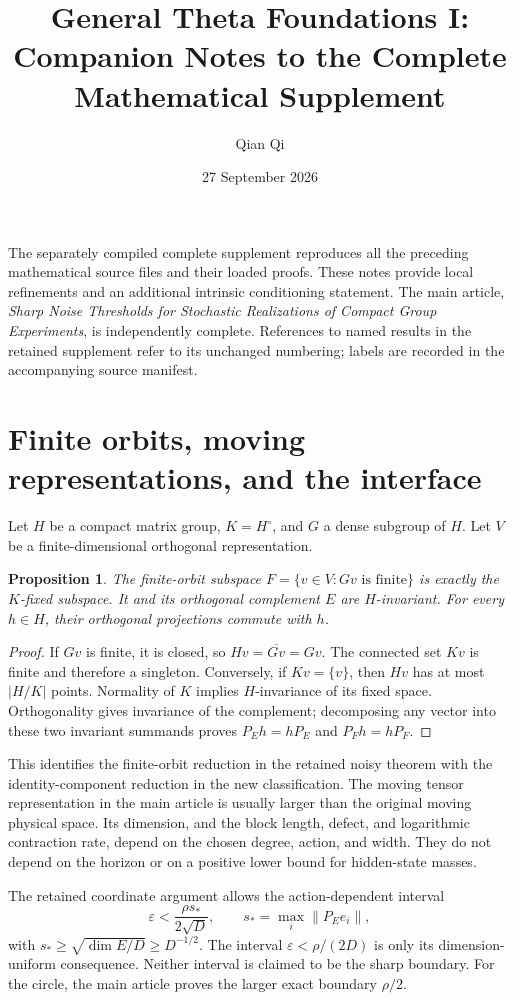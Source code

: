 \documentclass[11pt]{amsart}
\title[Companion notes to Foundations I]{General Theta Foundations I:\\Companion Notes to the Complete Mathematical Supplement}
\author{Qian Qi}
\date{27 September 2026}
\numberwithin{equation}{section}
\newtheorem{proposition}{Proposition}[section]
\newcommand{\norm}[1]{\lVert#1\rVert}
\begin{document}
\maketitle
The separately compiled complete supplement reproduces all the preceding mathematical source files and their loaded proofs. These notes provide local refinements and an additional intrinsic conditioning statement. The main article, \emph{Sharp Noise Thresholds for Stochastic Realizations of Compact Group Experiments}, is independently complete. References to named results in the retained supplement refer to its unchanged numbering; labels are recorded in the accompanying source manifest.

\section{Finite orbits, moving representations, and the interface}
Let $H$ be a compact matrix group, $K=H^\circ$, and $G$ a dense subgroup of $H$. Let $V$ be a finite-dimensional orthogonal representation.
\begin{proposition}\label{note:fixed53}
The finite-orbit subspace $F=\{v\in V:Gv\text{ is finite}\}$ is exactly the $K$-fixed subspace. It and its orthogonal complement $E$ are $H$-invariant. For every $h\in H$, their orthogonal projections commute with $h$.
\end{proposition}
\begin{proof}
If $Gv$ is finite, it is closed, so $Hv=\overline{Gv}=Gv$. The connected set $Kv$ is finite and therefore a singleton. Conversely, if $Kv=\{v\}$, then $Hv$ has at most $|H/K|$ points. Normality of $K$ implies $H$-invariance of its fixed space. Orthogonality gives invariance of the complement; decomposing any vector into these two invariant summands proves $P_Eh=hP_E$ and $P_Fh=hP_F$.
\end{proof}
This identifies the finite-orbit reduction in the retained noisy theorem with the identity-component reduction in the new classification. The moving tensor representation in the main article is usually larger than the original moving physical space. Its dimension, and the block length, defect, and logarithmic contraction rate, depend on the chosen degree, action, and width. They do not depend on the horizon or on a positive lower bound for hidden-state masses.

The retained coordinate argument allows the action-dependent interval
\[
 \varepsilon<\frac{\rho s_*}{2\sqrt D},\qquad
 s_*=\max_i\norm{P_Ee_i},
\]
with $s_*\ge\sqrt{\dim E/D}\ge D^{-1/2}$. The interval $\varepsilon<\rho/(2D)$ is only its dimension-uniform consequence. Neither interval is claimed to be the sharp boundary. For the circle, the main article proves the larger exact boundary $\rho/2$.
\end{document}
